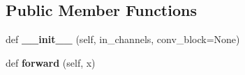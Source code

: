 \subsection*{Public Member Functions}
\begin{DoxyCompactItemize}
\item 
\mbox{\label{classtorchvision_1_1models_1_1inception_1_1InceptionE_a5df124b42fc4e3dff8f73f7d5147d7a7}} 
def {\bfseries \+\_\+\+\_\+init\+\_\+\+\_\+} (self, in\+\_\+channels, conv\+\_\+block=None)
\item 
\mbox{\label{classtorchvision_1_1models_1_1inception_1_1InceptionE_ae6307181e611e564269ee02cdc27c31f}} 
def {\bfseries forward} (self, x)
\end{DoxyCompactItemize}
